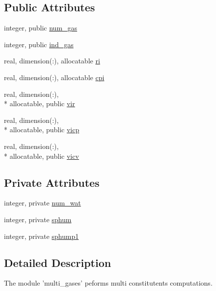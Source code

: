 \subsection*{Public Attributes}
\begin{DoxyCompactItemize}
\item 
integer, public \hyperlink{classmulti__gases__mod_ada7f0ffe52c60fbe7f6cafd04490c4d8}{num\-\_\-gas}
\item 
integer, public \hyperlink{classmulti__gases__mod_a15e4b81a202b85b77802dce9c489b1a9}{ind\-\_\-gas}
\item 
real, dimension(\-:), allocatable \hyperlink{classmulti__gases__mod_acdbd2cbc0014ad073f6daadeffc5cfce}{ri}
\item 
real, dimension(\-:), allocatable \hyperlink{classmulti__gases__mod_a85983a7159ef293fa1c2d65647a66400}{cpi}
\item 
real, dimension(\-:), \\*
allocatable, public \hyperlink{classmulti__gases__mod_a39e5146fa83f5edbe8479cd345968d9c}{vir}
\item 
real, dimension(\-:), \\*
allocatable, public \hyperlink{classmulti__gases__mod_a3e01739eaf6bc27d9db8770ec4c9cd69}{vicp}
\item 
real, dimension(\-:), \\*
allocatable, public \hyperlink{classmulti__gases__mod_a4a8d9ed9352b8bfd8daa59b36ab2430f}{vicv}
\end{DoxyCompactItemize}
\subsection*{Private Attributes}
\begin{DoxyCompactItemize}
\item 
integer, private \hyperlink{classmulti__gases__mod_a927f93aad16256efbf50824dc3897194}{num\-\_\-wat}
\item 
integer, private \hyperlink{classmulti__gases__mod_ac1567ae48756e1ad1df7f99d1a86592a}{sphum}
\item 
integer, private \hyperlink{classmulti__gases__mod_a0e5f32ab60bce2b41eda0ae1e1f47bee}{sphump1}
\end{DoxyCompactItemize}


\subsection{Detailed Description}
The module 'multi\-\_\-gases' peforms multi constitutents computations. 

